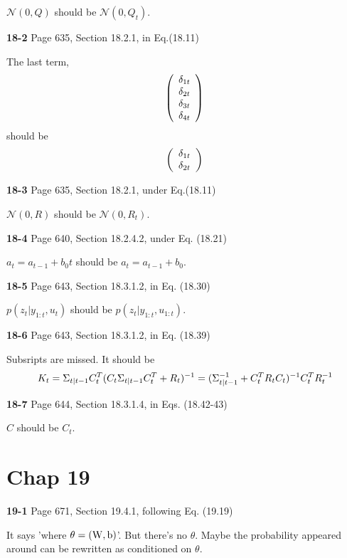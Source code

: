 \documentclass[aps,preprint,a4]{revtex4-1}
\newcommand{\nl}{\nonumber \\}
\begin{document}
$\mathcal N(0,Q)$ should be $\mathcal N(0,Q_{t})$.

{\color{red}\textbf{18-2}} Page 635, Section 18.2.1, in Eq.(18.11)

The last term,
\begin{equation}
\left(\begin{array}{c}\delta_{1t} \\ \delta_{2t} \\ \delta_{3t} \\ \delta_{4t}\end{array}\right)\nl
\end{equation}
should be
\begin{equation}
\left(\begin{array}{c}\delta_{1t} \\ \delta_{2t} \end{array}\right)\nl
\end{equation}

{\color{red}\textbf{18-3}} Page 635, Section 18.2.1, under Eq.(18.11)

$\mathcal N(0,R)$ should be $\mathcal N(0,R_{t})$.

{\color{red}\textbf{18-4}} Page 640, Section 18.2.4.2, under Eq. (18.21)

$a_{t}=a_{t-1}+b_{0}t$ should be $a_{t}=a_{t-1}+b_{0}$.

{\color{red}\textbf{18-5}} Page 643, Section 18.3.1.2, in Eq. (18.30)

$p(z_{t}|y_{1:t},u_{t})$ should be $p(z_{t}|y_{1:t},u_{1:t})$.

{\color{red}\textbf{18-6}} Page 643, Section 18.3.1.2, in Eq. (18.39)

Subsripts are missed. It should be
\begin{equation}
K_{t} = \Sigma_{t|t-1}C^{T}_{t}(C_{t}\Sigma_{t|t-1}C^{T}_{t}+R_{t})^{-1}
=(\Sigma_{t|t-1}^{-1} + C^{T}_{t}R_{t}C_{t})^{-1}C^{T}_{t}R^{-1}_{t}\nl
\end{equation}

{\color{red}\textbf{18-7}} Page 644, Section 18.3.1.4, in Eqs. (18.42-43)

$C$ should be $C_{t}$.

\section{Chap 19}
{\color{red}\textbf{19-1}} Page 671, Section 19.4.1, following Eq. (19.19)

It says 'where $\theta=(\rm W,b)$'. But there's no $\theta$. 
Maybe the probability appeared around can be rewritten as conditioned on $\theta$.
\end{document}
